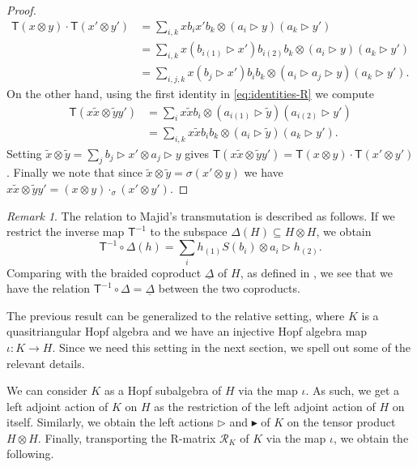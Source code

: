 \documentclass[a4paper, 12pt, reqno, english]{amsart}
\numberwithin{equation}{section}
\numberwithin{figure}{section}
\theoremstyle{plain}
\theoremstyle{plain}
\theoremstyle{plain}
\theoremstyle{plain}
\theoremstyle{plain}
\theoremstyle{definition}
\theoremstyle{definition}
\theoremstyle{definition}
\theoremstyle{remark}
\newtheorem{remark}[theorem]{Remark}
\theoremstyle{definition}
\theoremstyle{definition}
\newcommand{\calR}{\mathcal{R}}
\newcommand{\tmap}{\mathsf{T}}
\begin{document}
\begin{proof}
\[\begin{split}
\tmap(x \otimes y) \cdot \tmap(x' \otimes y')
& = \sum_{i, k} x b_i x' b_k \otimes (a_i \triangleright y) (a_k \triangleright y') \\
& = \sum_{i, k} x (b_{i (1)} \triangleright x') b_{i (2)} b_k \otimes (a_i \triangleright y) (a_k \triangleright y') \\
& = \sum_{i, j, k} x (b_j \triangleright x') b_i b_k \otimes (a_i \triangleright a_j \triangleright y) (a_k \triangleright y').
\end{split}
\]
On the other hand, using the first identity in \eqref{eq:identities-R} we compute
\[
\begin{split}
\tmap(x \tilde{x} \otimes \tilde{y} y')
& = \sum_i x \tilde{x} b_i \otimes (a_{i (1)} \triangleright \tilde{y}) (a_{i (2)} \triangleright y') \\
& = \sum_{i, k} x \tilde{x} b_i b_k \otimes (a_i \triangleright \tilde{y}) (a_k \triangleright y').
\end{split}
\]
Setting $\tilde{x} \otimes \tilde{y} = \sum_j b_j \triangleright x' \otimes a_j \triangleright y$ gives $\tmap(x \tilde{x} \otimes \tilde{y} y') = \tmap(x \otimes y) \cdot \tmap(x' \otimes y')$.
Finally we note that since $\tilde{x} \otimes \tilde{y} = \sigma(x' \otimes y)$ we have $x \tilde{x} \otimes \tilde{y} y' = (x \otimes y) \cdot_\sigma (x' \otimes y')$.
\end{proof}

\begin{remark}
The relation to Majid's transmutation is described as follows.
If we restrict the inverse map $\tmap^{-1}$ to the subspace $\Delta(H) \subseteq H \otimes H$, we obtain
\[
\tmap^{-1} \circ \Delta(h) = \sum_i h_{(1)} S(b_i) \otimes a_i \triangleright h_{(2)}.
\]
Comparing with the braided coproduct $\underline{\Delta}$ of $H$, as defined  in \cite[Theorem 7.4.2]{majid-book}, we see that we have the relation $\tmap^{-1} \circ \Delta = \underline{\Delta}$ between the two coproducts.
\end{remark}

The previous result can be generalized to the relative setting, where $K$ is a quasitriangular Hopf algebra and we have an injective Hopf algebra map $\iota: K \to H$.
Since we need this setting in the next section, we spell out some of the relevant details.

We can consider $K$ as a Hopf subalgebra of $H$ via the map $\iota$. As such, we get a left adjoint action of $K$ on $H$ as the restriction of the left adjoint action of $H$ on itself. Similarly, we obtain the left actions $\triangleright$ and $\blacktriangleright$ of $K$ on the tensor product $H \otimes H$.
Finally, transporting the R-matrix $\calR_K$ of $K$ via the map $\iota$, we obtain the following.
\end{document}
